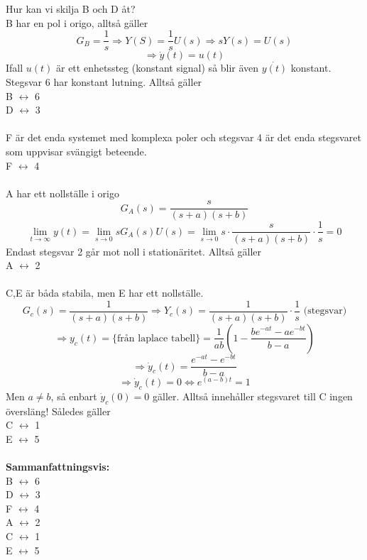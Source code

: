 \documentclass[12pt]{article}
\begin{document}
Hur kan vi skilja B och D åt? \\
B har en pol i origo, alltså gäller
\[G_B = \frac{1}{s} \Rightarrow Y(S) = \frac{1}{s}U(s) \Rightarrow sY(s) = U(s)\]
\[\Rightarrow \dot{y}(t) = u(t) \]
Ifall $u(t)$ är ett enhetssteg (konstant signal) så blir även $\dot{y(t)}$ konstant. Stegsvar 6 har konstant lutning. Alltså gäller \\
B $\leftrightarrow$ 6 \\
D $\leftrightarrow$ 3 \\\\
F är det enda systemet med komplexa poler och stegsvar 4 är det enda stegsvaret som uppvisar svängigt beteende. \\
F $\leftrightarrow$ 4 \\\\
A har ett nollställe i origo 
\[G_A (s) = \frac{s}{(s+a)(s+b)}\]
\[\lim_{t \to \infty} y(t) = \lim_{s \to 0} sG_A (s) U(s) = \lim_{s \to 0} s \cdot \frac{s}{(s+a)(s+b)} \cdot \frac{1}{s} = 0\]
Endast stegsvar 2 går mot noll i stationäritet. Alltså gäller \\
A $\leftrightarrow$ 2 \\\\
C,E är båda stabila, men E har ett nollställe.
\[G_c(s) = \frac{1}{(s+a)(s+b)} \Rightarrow Y_c (s) = \frac{1}{(s+a)(s+b)} \cdot \frac{1}{s} \text{ (stegsvar)}\]
\[\Rightarrow y_c (t) = \lbrace \text{från laplace tabell} \rbrace = \frac{1}{ab} \left(1 - \frac{be^{-at}-ae^{-bt}}{b-a}\right)\]
\[\Rightarrow \dot{y}_c(t) = \frac{e^{-at} - e^{-bt}}{b-a}\]
\[\Rightarrow \dot{y}_c(t) = 0 \Leftrightarrow e^{(a-b)t} = 1 \]
Men $a \neq b$, så enbart $\dot{y}_c (0) = 0$ gäller. Alltså innehåller stegsvaret till C ingen översläng! Således gäller \\
C $\leftrightarrow$ 1 \\
E $\leftrightarrow$ 5 \\\\
\textbf{Sammanfattningsvis:} \\
B $\leftrightarrow$ 6 \\
D $\leftrightarrow$ 3 \\
F $\leftrightarrow$ 4 \\
A $\leftrightarrow$ 2 \\
C $\leftrightarrow$ 1 \\
E $\leftrightarrow$ 5 \\
\end{document}
